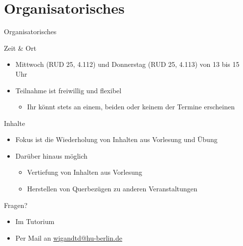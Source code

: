 \section*{Organisatorisches}

\begin{frame}{Organisatorisches}
\begin{block}{Zeit \& Ort}
    \begin{itemize}
        \item Mittwoch (RUD 25, 4.112) und Donnerstag (RUD 25, 4.113) von 13 bis 15 Uhr
        \item Teilnahme ist \alert{freiwillig} und \alert{flexibel}
        \begin{itemize}
            \item Ihr könnt stets an \alert{einem}, \alert{beiden} oder \alert{keinem} der Termine erscheinen
        \end{itemize}
    \end{itemize}
\end{block}

\begin{block}{Inhalte}
    \begin{itemize}
        \item Fokus ist die \alert{Wiederholung} von Inhalten aus Vorlesung und Übung
        \item Dar\"uber hinaus m\"oglich
        \begin{itemize}
            \item \alert{Vertiefung} von Inhalten aus Vorlesung
            \item Herstellen von \alert{Querbez\"ugen} zu anderen Veranstaltungen
        \end{itemize}
    \end{itemize}
\end{block}
\end{frame}

\begin{frame}{Fragen?}
\begin{itemize}
    \item Im Tutorium
    \item Per Mail an \alert{\href{mailto:wigandtd@hu-berlin.de}{wigandtd@hu-berlin.de}}
\end{itemize}
\end{frame}